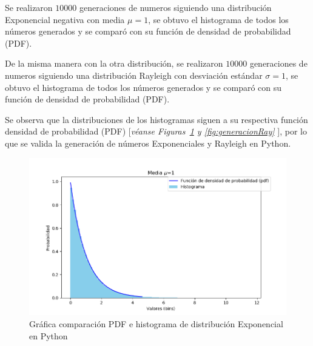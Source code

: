 Se realizaron $10000$ generaciones de numeros siguiendo una distribución Exponencial negativa con media $\mu =1$, se obtuvo el histograma de todos los números generados y se comparó con su función de densidad de probabilidad (PDF).\newline

De la misma manera con la otra distribución, se realizaron $10000$ generaciones de numeros siguiendo una distribución Rayleigh con desviación estándar $\sigma = 1$, se obtuvo el histograma de todos los números generados y se comparó con su función de densidad de probabilidad (PDF).\newline

Se observa que la distribuciones de los histogramas siguen a su respectiva función densidad de probabilidad (PDF) [\textit{véanse Figuras~\ref{fig:generacionExpon} y \ref{fig:generacionRay} }], por lo que se valida la generación de números Exponenciales y Rayleigh en Python.\newline

\begin{figure}[th]
    \centering
    \includegraphics[scale=.7]{Figures/ExponentialDisitribution.png}
    \decoRule
    \caption[Gráfica comparación PDF e histograma de distribución Exponencial en Python]{Gráfica comparación PDF e histograma de distribución Exponencial en Python}
    \label{fig:generacionExpon}
\end{figure}

